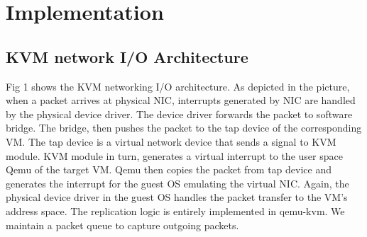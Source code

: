  \section{Implementation} \label{sec:impl}

\subsection{KVM network I/O Architecture}\label{sec:architecture}
Fig 1 shows the KVM networking I/O architecture. As depicted in the picture,
when a packet arrives at physical NIC, interrupts generated by NIC are handled 
by the physical device driver. The device driver forwards the packet to software 
bridge. The bridge, then pushes the packet to the tap device of the corresponding 
VM. The tap device is a virtual network device that sends a signal to KVM module. 
KVM module in turn, generates a virtual interrupt to the user space Qemu of the 
target VM. Qemu then copies the packet from tap device and generates the interrupt 
for the guest OS emulating the virtual NIC. Again, the physical device driver in 
the guest OS handles the packet transfer to the VM’s address space.
The replication logic is entirely implemented in qemu-kvm.
We maintain a packet queue to capture outgoing packets.
